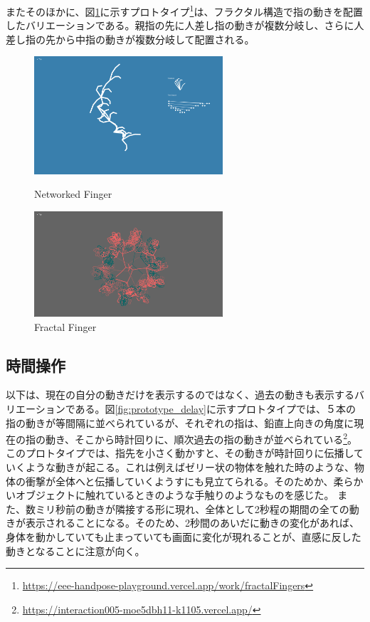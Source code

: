またそのほかに、図\ref{fig:fractal_finger}に示すプロトタイプ\footnote{\url{https://eee-handpose-playground.vercel.app/work/fractalFingers}}は、フラクタル構造で指の動きを配置したバリエーションである。親指の先に人差し指の動きが複数分岐し、さらに人差し指の先から中指の動きが複数分岐して配置される。

\begin{figure}[htbp]
  \begin{minipage}[b]{0.5\linewidth}
    \centering
    \includegraphics[keepaspectratio, width=7cm]{img/networked_finger.png}
    \caption{Networked Finger}
    \label{fig:networked_finger}
  \end{minipage}
  \begin{minipage}[b]{0.5\linewidth}
    \centering
    \includegraphics[keepaspectratio, width=7cm]{img/fractel_finger.png}
    \caption{Fractal Finger}
    \label{fig:fractal_finger}
  \end{minipage}
\end{figure}

\subsection{時間操作}
以下は、現在の自分の動きだけを表示するのではなく、過去の動きも表示するバリエーションである。図\ref{fig:prototype_delay}に示すプロトタイプでは、５本の指の動きが等間隔に並べられているが、それぞれの指は、鉛直上向きの角度に現在の指の動き、そこから時計回りに、順次過去の指の動きが並べられている\footnote{\url{https://interaction005-moe5dbh11-k1105.vercel.app/}}。このプロトタイプでは、指先を小さく動かすと、その動きが時計回りに伝播していくような動きが起こる。これは例えばゼリー状の物体を触れた時のような、物体の衝撃が全体へと伝播していくようすにも見立てられる。そのためか、柔らかいオブジェクトに触れているときのような手触りのようなものを感じた。
また、数ミリ秒前の動きが隣接する形に現れ、全体として2秒程の期間の全ての動きが表示されることになる。そのため、2秒間のあいだに動きの変化があれば、身体を動かしていても止まっていても画面に変化が現れることが、直感に反した動きとなることに注意が向く。


